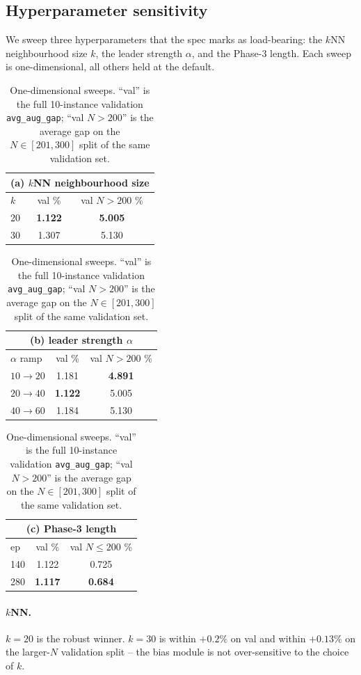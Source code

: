 \documentclass[11pt,a4paper]{article}
\begin{document}
\subsection{Hyperparameter sensitivity}
\label{sec:sens}

We sweep three hyperparameters that the spec marks as load-bearing:
the $k$NN neighbourhood size $k$, the leader strength $\alpha$, and the
Phase-3 length. Each sweep is one-dimensional, all others held at the
default.

\begin{table}[t]
\centering
\caption{One-dimensional sweeps. ``val'' is the full 10-instance
validation \texttt{avg\_aug\_gap}; ``val $N>200$'' is the average gap on
the $N\!\in\![201,300]$ split of the same validation set.}
\label{tab:sens}
\small
\begin{tabular}{l c c}
\toprule
\multicolumn{3}{c}{\textbf{(a) $k$NN neighbourhood size}}\\
\midrule
$k$ & val \% & val $N>200$ \% \\
\midrule
20  & \textbf{1.122} & \textbf{5.005} \\
30  & 1.307         & 5.130 \\
\bottomrule
\end{tabular}
\quad
\begin{tabular}{l c c}
\toprule
\multicolumn{3}{c}{\textbf{(b) leader strength $\alpha$}}\\
\midrule
$\alpha$ ramp        & val \% & val $N>200$ \% \\
\midrule
$10\!\to\!20$        & 1.181  & \textbf{4.891} \\
$20\!\to\!40$        & \textbf{1.122}  & 5.005 \\
$40\!\to\!60$        & 1.184  & 5.130 \\
\bottomrule
\end{tabular}
\quad
\begin{tabular}{l c c}
\toprule
\multicolumn{3}{c}{\textbf{(c) Phase-3 length}}\\
\midrule
ep   & val \% & val $N\!\le\!200$ \% \\
\midrule
140  & 1.122  & 0.725 \\
280  & \textbf{1.117}  & \textbf{0.684} \\
\bottomrule
\end{tabular}
\end{table}

\paragraph{$k$NN.} $k=20$ is the robust winner. $k=30$ is within
$+0.2\%$ on val and within $+0.13\%$ on the larger-$N$ validation split
-- the bias module is not over-sensitive to the choice of $k$.
\end{document}
